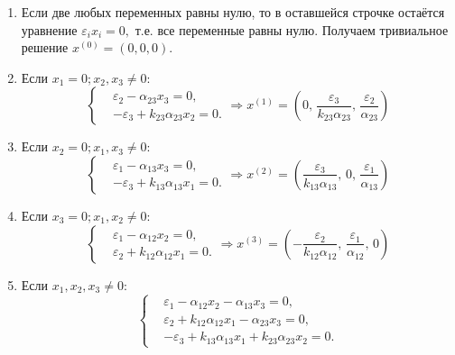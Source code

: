     \begin{enumerate}
        \item Если две любых переменных равны нулю, то в оставшейся строчке остаётся уравнение \( \varepsilon_i x_i = 0, \) т.е. все переменные равны нулю. Получаем тривиальное решение \( x^{(0)} = (0,0,0) \).
        \item Если \( x_1 = 0; x_2, x_3 \neq 0 \):
            \[
                \left\{\begin{split}
                    & \varepsilon_2 - \alpha_{23} x_3 = 0, \\
                    & -\varepsilon_3 + k_{23} \alpha_{23} x_2 = 0. 
                \end{split}\right.
                \Rightarrow
                x^{(1)} = \left( 0,\, \frac{\varepsilon_3}{k_{23} \alpha_{23}},\, \frac{\varepsilon_2}{\alpha_{23}} \right)
            \]
        \item Если \( x_2 = 0; x_1, x_3 \neq 0 \):
            \[
                \left\{\begin{split}
                    & \varepsilon_1 - \alpha_{13} x_3 = 0, \\
                    & -\varepsilon_3 + k_{13} \alpha_{13} x_1 = 0. 
                \end{split}\right.
                \Rightarrow
                x^{(2)} = \left( \frac{\varepsilon_3}{k_{13} \alpha_{13}},\, 0,\, \frac{\varepsilon_1}{\alpha_{13}} \right)
            \]
        \item Если \( x_3 = 0; x_1, x_2 \neq 0 \):
            \[
                \left\{\begin{split}
                    & \varepsilon_1 - \alpha_{12} x_2 = 0, \\
                    & \varepsilon_2 + k_{12} \alpha_{12} x_1 = 0. 
                \end{split}\right.
                \Rightarrow
                x^{(3)} = \left( -\frac{\varepsilon_2}{k_{12} \alpha_{12}},\, \frac{\varepsilon_1}{\alpha_{12}},\, 0 \right)
            \]
        \item Если \( x_1, x_2, x_3 \neq 0 \):
            \[
                \left\{\begin{split}
                    & \varepsilon_1 - \alpha_{12} x_2 - \alpha_{13} x_3 = 0, \\
                    & \varepsilon_2 + k_{12} \alpha_{12} x_1 - \alpha_{23} x_3 = 0, \\
                    & -\varepsilon_3 + k_{13} \alpha_{13} x_1 + k_{23} \alpha_{23} x_2 = 0. 

\end{split}\]
\end{enumerate}
